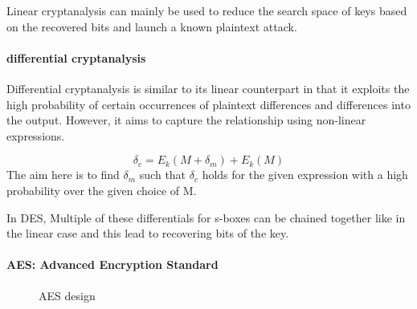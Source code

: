 Linear cryptanalysis can mainly be used to reduce the search space of keys based on the recovered bits and launch a known plaintext attack.

\paragraph{differential cryptanalysis}
Differential cryptanalysis is similar to its linear counterpart in that it exploits the high probability of certain occurrences of plaintext
differences and differences into the output. However, it aims to capture the relationship using non-linear expressions.

\[ \delta_c = E_k(M + \delta_m) + E_k(M) \] 
The aim here is to find \( \delta_m \) such that \( \delta_c \) holds for the given expression with a high probability over the given choice of M. \newline

In DES, Multiple of these differentials for s-boxes can be chained together like in the linear case and this lead to recovering bits of the key.


\paragraph{AES: Advanced Encryption Standard}

\begin{wrapfigure}{r}{2.3in}
\center
{}

\caption{AES design}
\label{fig:aesDesign}
\end{wrapfigure}

